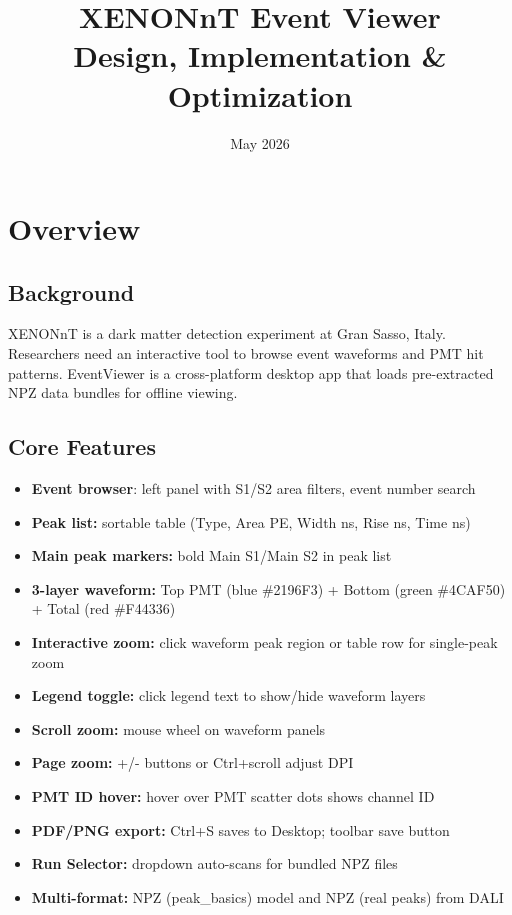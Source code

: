 \documentclass[12pt,a4paper]{article}
\title{XENONnT Event Viewer \\ Design, Implementation \& Optimization}
\author{}
\date{May 2026}
\begin{document}
\maketitle
\tableofcontents
\newpage

\section{Overview}

\subsection{Background}
XENONnT is a dark matter detection experiment at Gran Sasso, Italy. Researchers need an interactive tool to browse event waveforms and PMT hit patterns. EventViewer is a cross-platform desktop app that loads pre-extracted NPZ data bundles for offline viewing.

\subsection{Core Features}
\begin{itemize}[itemsep=2pt]
\item \textbf{Event browser}: left panel with S1/S2 area filters, event number search
\item \textbf{Peak list:} sortable table (Type, Area PE, Width ns, Rise ns, Time ns)
\item \textbf{Main peak markers:} bold Main S1/Main S2 in peak list
\item \textbf{3-layer waveform:} Top PMT (blue \#2196F3) + Bottom (green \#4CAF50) + Total (red \#F44336)
\item \textbf{Interactive zoom:} click waveform peak region or table row for single-peak zoom
\item \textbf{Legend toggle:} click legend text to show/hide waveform layers
\item \textbf{Scroll zoom:} mouse wheel on waveform panels
\item \textbf{Page zoom:} +/- buttons or Ctrl+scroll adjust DPI
\item \textbf{PMT ID hover:} hover over PMT scatter dots shows channel ID
\item \textbf{PDF/PNG export:} Ctrl+S saves to Desktop; toolbar save button
\item \textbf{Run Selector:} dropdown auto-scans for bundled NPZ files
\item \textbf{Multi-format:} NPZ (peak\_basics) model and NPZ (real peaks) from DALI
\end{itemize}
\end{document}
